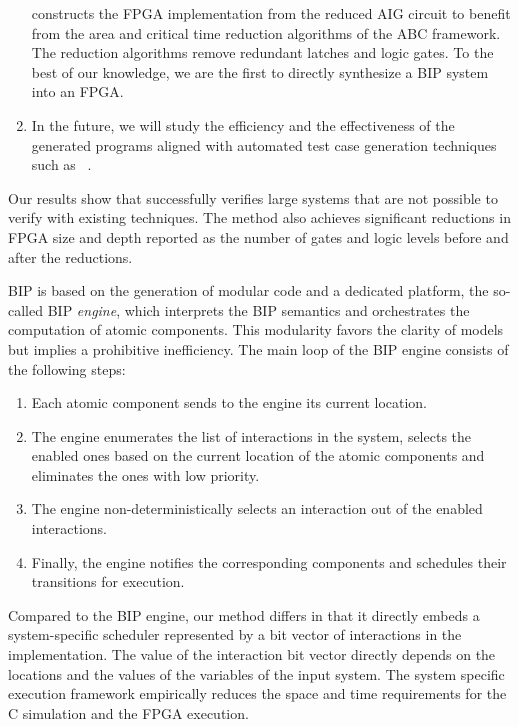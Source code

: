 \begin{enumerate}
  \biptool{} constructs the FPGA implementation from the reduced AIG circuit 
  to benefit from the area and critical time reduction algorithms 
  of the ABC framework. 
  The reduction algorithms remove redundant latches and logic gates.  
  To the best of our knowledge, we are the first to directly synthesize a BIP system into an FPGA. 

\item {}
In the future, we will study the efficiency and the effectiveness of the generated \caig programs aligned with automated test case generation techniques such as ~\cite{kbse-BurnimS08}.
\end{enumerate}
%

Our results show that \biptool{} successfully verifies large systems that are not possible to verify with existing techniques. 
The method also achieves significant reductions in FPGA size and depth reported as the 
number of gates and logic levels before and after the reductions.

BIP is based on the generation of modular code and a dedicated platform, the so-called BIP \emph{engine}, which interprets the BIP semantics and orchestrates the computation of atomic components. This modularity favors the clarity of models but implies a prohibitive inefficiency. The main loop of the BIP engine consists of the following steps:
%
\begin{enumerate}
\item Each atomic component sends to the engine its current location.
\item The engine enumerates the list of interactions in the system, 
  selects the enabled ones based on the current location of the atomic 
  components and eliminates the ones with low priority.
\item The engine non-deterministically selects an interaction out of the enabled interactions.
\item Finally, the engine notifies the corresponding components and schedules their transitions for execution. 
\end{enumerate}
%
Compared to the BIP engine, our method differs in that it directly embeds a system-specific scheduler represented by a bit vector of interactions in the implementation.
The value of the  interaction bit vector directly depends on the locations and the values of the variables of the input system. 
The system specific execution framework empirically reduces the space and time requirements for the C simulation and the FPGA execution. 

